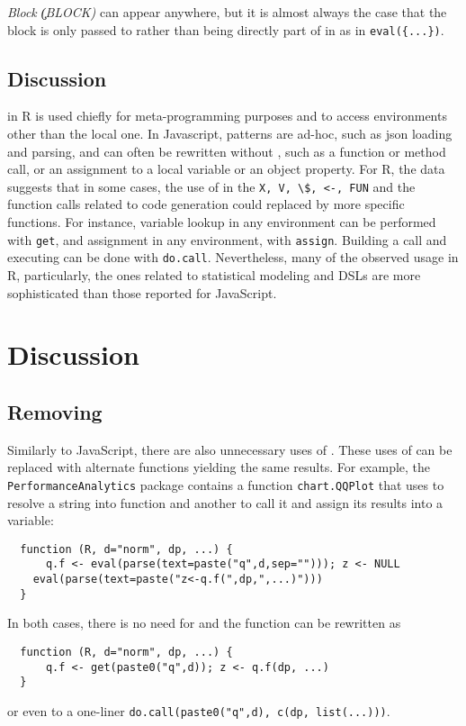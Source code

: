 \documentclass[screen,acmsmall]{acmart}%
\newcommand{\authorcomment}[3]{\xspace\textcolor{#1}{{\bf #2} #3}\xspace}
\newcommand{\todo}[1]{\authorcomment{red}{TODO}{#1}}
\newcommand{\code}[1]{\lstinline |#1|\xspace}
\begin{document}
\begin{compactitem}[---]
  \item \emph{Block \c{(BLOCK)}} can appear anywhere, but it is almost always
    the case that the block is only passed to \eval rather than being directly
    part of in as in \lstinline|eval({...})|. 
\end{compactitem}





\subsection{Discussion}

\Eval in R is used chiefly for meta-programming purposes and to access
environments other than the local one. In Javascript, patterns are ad-hoc, such
as json loading and parsing, and can often be rewritten without \eval, such as a
function or method call, or an assignment to a local variable or an object
property. For R, the data suggests that in some cases, the use of \eval in the
\code{X, V, \$, <-, FUN} and the function calls related to code generation could
replaced by more specific functions. For instance, variable lookup in any
environment can be performed with \code{get}, and assignment in any environment,
with \code{assign}. Building a call and executing can be done with \code{do.call}.
Nevertheless, many of the observed \eval usage in R, particularly, the ones
related to statistical modeling and DSLs are more sophisticated than those
reported for JavaScript.



\section{Discussion}

\subsection{Removing \eval}

Similarly to JavaScript, there are also unnecessary uses of \eval. These uses of
\eval can be replaced with alternate functions yielding the same results. For
example, the \code{PerformanceAnalytics} package contains a function
\code{chart.QQPlot} that uses \eval to resolve a string into function and another
to call it and assign its results into a variable:
\begin{lstlisting}
  function (R, d="norm", dp, ...) {
	  q.f <- eval(parse(text=paste("q",d,sep=""))); z <- NULL
  	eval(parse(text=paste("z<-q.f(",dp,",...)")))
  }
\end{lstlisting}
  In both cases, there is no need for \eval and the function can be rewritten as
\begin{lstlisting}
  function (R, d="norm", dp, ...) {
	  q.f <- get(paste0("q",d)); z <- q.f(dp, ...)
  }
\end{lstlisting}
  or even to a one-liner \code{do.call(paste0("q",d), c(dp, list(...)))}.
\end{document}
